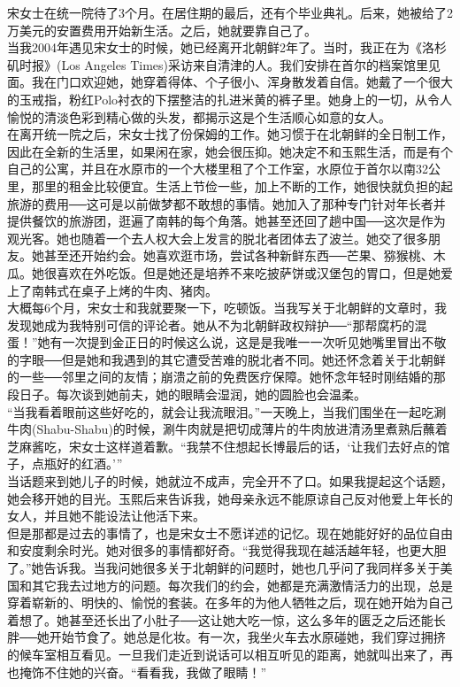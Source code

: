 宋女士在统一院待了3个月。在居住期的最后，还有个毕业典礼。后来，她被给了2万美元的安置费用开始新生活。之后，她就要靠自己了。\\

当我2004年遇见宋女士的时候，她已经离开北朝鲜2年了。当时，我正在为《洛杉矶时报》(Los Angeles Times)采访来自清津的人。我们安排在首尔的档案馆里见面。我在门口欢迎她，她穿着得体、个子很小、浑身散发着自信。她戴了一个很大的玉戒指，粉红Polo衬衣的下摆整洁的扎进米黄的裤子里。她身上的一切，从令人愉悦的清淡色彩到精心做的头发，都揭示这是个生活顺心如意的女人。\\

在离开统一院之后，宋女士找了份保姆的工作。她习惯于在北朝鲜的全日制工作，因此在全新的生活里，如果闲在家，她会很压抑。她决定不和玉熙生活，而是有个自己的公寓，并且在水原市的一个大楼里租了个工作室，水原位于首尔以南32公里，那里的租金比较便宜。生活上节俭一些，加上不断的工作，她很快就负担的起旅游的费用──这可是以前做梦都不敢想的事情。她加入了那种专门针对年长者并提供餐饮的旅游团，逛遍了南韩的每个角落。她甚至还回了趟中国──这次是作为观光客。她也随着一个去人权大会上发言的脱北者团体去了波兰。她交了很多朋友。她甚至还开始约会。她喜欢逛市场，尝试各种新鲜东西──芒果、猕猴桃、木瓜。她很喜欢在外吃饭。但是她还是培养不来吃披萨饼或汉堡包的胃口，但是她爱上了南韩式在桌子上烤的牛肉、猪肉。\\

大概每6个月，宋女士和我就要聚一下，吃顿饭。当我写关于北朝鲜的文章时，我发现她成为我特别可信的评论者。她从不为北朝鲜政权辩护──“那帮腐朽的混蛋！”她有一次提到金正日的时候这么说，这是是我唯一一次听见她嘴里冒出不敬的字眼──但是她和我遇到的其它遭受苦难的脱北者不同。她还怀念着关于北朝鲜的一些──邻里之间的友情；崩溃之前的免费医疗保障。她怀念年轻时刚结婚的那段日子。每次谈到她前夫，她的眼睛会湿润，她的圆脸也会温柔。\\

“当我看着眼前这些好吃的，就会让我流眼泪。”一天晚上，当我们围坐在一起吃涮牛肉(Shabu-Shabu)的时候，涮牛肉就是把切成薄片的牛肉放进清汤里煮熟后蘸着芝麻酱吃，宋女士这样道着歉。“我禁不住想起长博最后的话，‘让我们去好点的馆子，点瓶好的红酒。’”\\

当话题来到她儿子的时候，她就泣不成声，完全开不了口。如果我提起这个话题，她会移开她的目光。玉熙后来告诉我，她母亲永远不能原谅自己反对他爱上年长的女人，并且她不能设法让他活下来。\\

但是那都是过去的事情了，也是宋女士不愿详述的记忆。现在她能好好的品位自由和安度剩余时光。她对很多的事情都好奇。“我觉得我现在越活越年轻，也更大胆了。”她告诉我。当我问她很多关于北朝鲜的问题时，她也几乎问了我同样多关于美国和其它我去过地方的问题。每次我们的约会，她都是充满激情活力的出现，总是穿着崭新的、明快的、愉悦的套装。在多年的为他人牺牲之后，现在她开始为自己着想了。她甚至还长出了小肚子──这让她大吃一惊，这么多年的匮乏之后还能长胖──她开始节食了。她总是化妆。有一次，我坐火车去水原碰她，我们穿过拥挤的候车室相互看见。一旦我们走近到说话可以相互听见的距离，她就叫出来了，再也掩饰不住她的兴奋。“看看我，我做了眼睛！”\\

